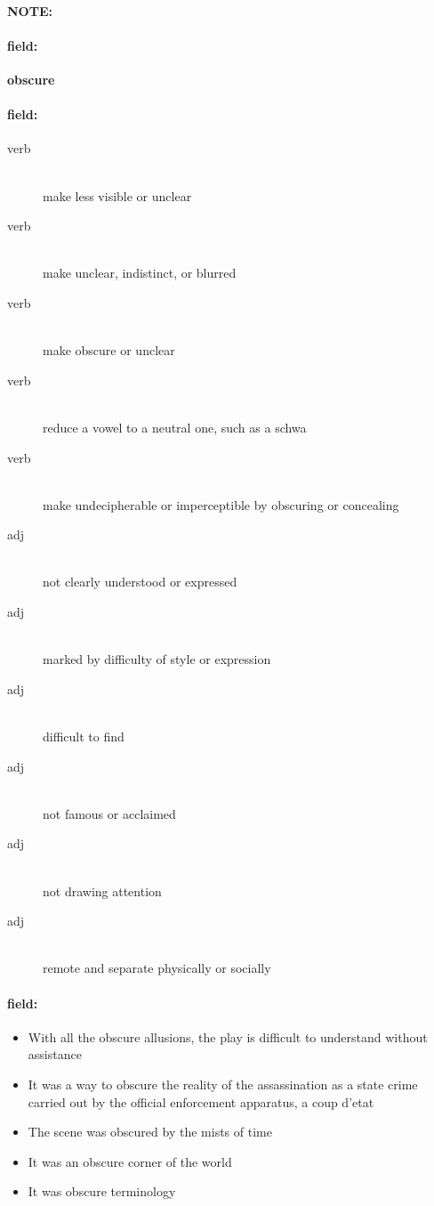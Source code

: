 \documentclass[12pt]{article}
\newenvironment{note}{\paragraph{NOTE:}}{}
\newenvironment{field}{\paragraph{field:}}{}
\begin{document}
\begin{note}
\begin{field}
\textbf{\large obscure}
\end{field}


\begin{field}
\begin{description}
\item[verb] \hfill \\ 
make less visible or unclear

\item[verb] \hfill \\ 
make unclear, indistinct, or blurred

\item[verb] \hfill \\ 
make obscure or unclear

\item[verb] \hfill \\ 
reduce a vowel to a neutral one, such as a schwa

\item[verb] \hfill \\ 
make undecipherable or imperceptible by obscuring or concealing

\item[adj] \hfill \\ 
not clearly understood or expressed

\item[adj] \hfill \\ 
marked by difficulty of style or expression

\item[adj] \hfill \\ 
difficult to find

\item[adj] \hfill \\ 
not famous or acclaimed

\item[adj] \hfill \\ 
not drawing attention

\item[adj] \hfill \\ 
remote and separate physically or socially

\end{description}
\end{field}

\begin{field}
\begin{itemize}
\item With all the obscure allusions, the play is difficult to understand without assistance
\item It was a way to obscure the reality of the assassination as a state crime carried out by the official enforcement apparatus, a coup d'etat
\item The scene was obscured by the mists of time
\item It was an obscure corner of the world
\item It was obscure terminology
\end{itemize}
\end{field}
\end{note}
\end{document}
